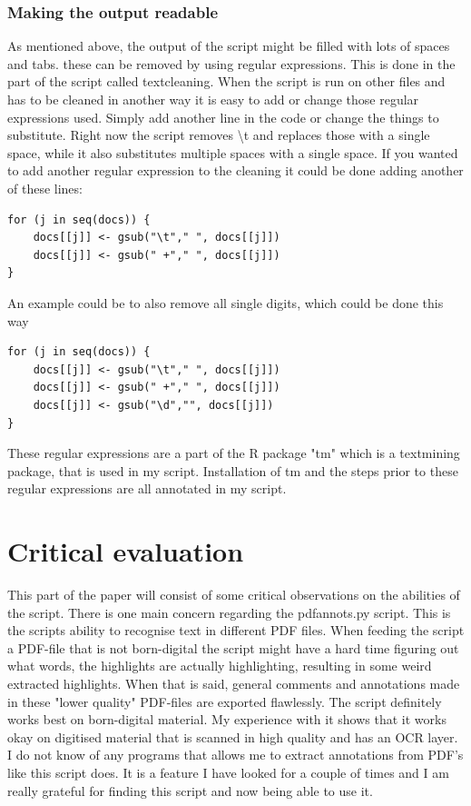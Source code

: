 \documentclass{article}
\begin{document}
\subsubsection{Making the output readable}
As mentioned above, the output of the script might be filled with lots of spaces and tabs. these can be removed by using regular expressions. This is done in the part of the script called textcleaning. When the script is run on other files and has to be cleaned in another way it is easy to add or change those regular expressions used. Simply add another line in the code or change the things to substitute. Right now the script removes \textbackslash t and replaces those with a single space, while it also substitutes multiple spaces with a single space. If you wanted to add another regular expression to the cleaning it could be done adding another of these lines:
\begin{verbatim}
for (j in seq(docs)) {
    docs[[j]] <- gsub("\t"," ", docs[[j]]) 
    docs[[j]] <- gsub(" +"," ", docs[[j]])
}
\end{verbatim}
An example could be to also remove all single digits, which could be done this way
\begin{verbatim}
for (j in seq(docs)) {
    docs[[j]] <- gsub("\t"," ", docs[[j]]) 
    docs[[j]] <- gsub(" +"," ", docs[[j]])
    docs[[j]] <- gsub("\d","", docs[[j]])
} 
\end{verbatim}
These regular expressions are a part of the R package "tm" which is a textmining package, that is used in my script. Installation of tm and the steps prior to these regular expressions are all annotated in my script. 

\section{Critical evaluation}
This part of the paper will consist of some critical observations on the abilities of the script. There is one main concern regarding the pdfannots.py script. This is the scripts ability to recognise text in different PDF files. When feeding the script a PDF-file that is not born-digital the script might have a hard time figuring out what words, the highlights are actually highlighting, resulting in some weird extracted highlights. When that is said, general comments and annotations made in these "lower quality" PDF-files are exported flawlessly. The script definitely works best on born-digital material. My experience with it shows that it works okay on digitised material that is scanned in high quality and has an OCR layer.\newline
I do not know of any programs that allows me to extract annotations from PDF's like this script does. It is a feature I have looked for a couple of times and I am really grateful for finding this script and now being able to use it.
\end{document}
